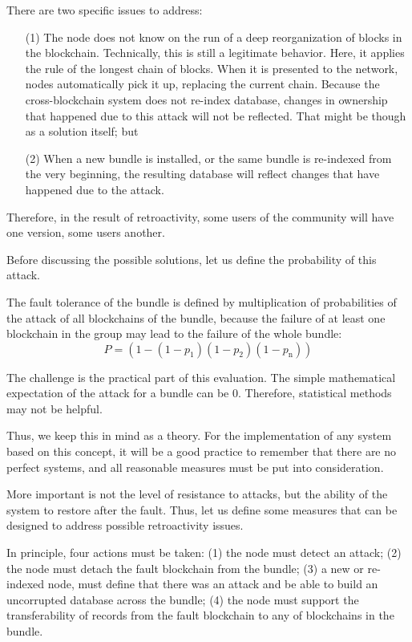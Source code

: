 \begin{multicols}{2}
There are two specific issues to address:
\begin{itemize}
\item[(1)] The node does not know on the run of a deep reorganization of blocks in the blockchain. Technically, this is still a legitimate behavior. Here, it applies the rule of the longest chain of blocks. When it is presented to the network, nodes automatically pick it up, replacing the current chain. Because the cross-blockchain system does not re-index database, changes in ownership that happened due to this attack will not be reflected. That might be though as a solution itself; but
\item[(2)] When a new bundle is installed, or the same bundle is re-indexed from the very beginning, the resulting database will reflect changes that have happened due to the attack.
\end{itemize}

Therefore, in the result of retroactivity, some users of the community will have one version, some users another.

Before discussing the possible solutions, let us define the probability of this attack.

The fault tolerance of the bundle is defined by multiplication of probabilities of the attack of all blockchains of the bundle, because the failure of at least one blockchain in the group may lead to the failure of the whole bundle:
\begin{equation}
P=(1-(1-p_{1})(1-p_{2})(1-p_{\text{n}}))\label{equ1}
\end{equation}

The challenge is the practical part of this evaluation. The simple mathematical expectation of the attack for a bundle can be 0. Therefore, statistical methods may not be helpful.

Thus, we keep this in mind as a theory. For the implementation of any system based on this concept, it will be a good practice to remember that there are no perfect systems, and all reasonable measures must be put into consideration.

More important is not the level of resistance to attacks, but the ability of the system to restore after the fault. Thus, let us define some measures that can be designed to address possible retroactivity issues.

In principle, four actions must be taken: (1) the node must detect an attack; (2) the node must detach the fault blockchain from the bundle; (3) a new or re-indexed node, must define that there was an attack and be able to build an uncorrupted database across the bundle; (4) the node must support the transferability of records from the fault blockchain to any of blockchains in the bundle.


\end{multicols}
